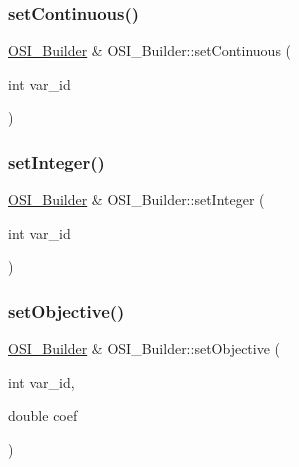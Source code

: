\mbox{\label{class_o_s_i___builder_abb4c8d13d5a3639ff22d9ec10960878c}} 
\subsubsection{\texorpdfstring{set\+Continuous()}{setContinuous()}}
{\footnotesize\ttfamily \hyperlink{class_o_s_i___builder}{O\+S\+I\+\_\+\+Builder} \& O\+S\+I\+\_\+\+Builder\+::set\+Continuous (\begin{DoxyParamCaption}\item[{int}]{var\+\_\+id }\end{DoxyParamCaption})}

\mbox{\label{class_o_s_i___builder_ab5da16db7740e228da63e4b58ab2069e}} 
\subsubsection{\texorpdfstring{set\+Integer()}{setInteger()}}
{\footnotesize\ttfamily \hyperlink{class_o_s_i___builder}{O\+S\+I\+\_\+\+Builder} \& O\+S\+I\+\_\+\+Builder\+::set\+Integer (\begin{DoxyParamCaption}\item[{int}]{var\+\_\+id }\end{DoxyParamCaption})}

\mbox{\label{class_o_s_i___builder_aaae1174492586d9ffe4b2cfec17823d7}} 
\subsubsection{\texorpdfstring{set\+Objective()}{setObjective()}}
{\footnotesize\ttfamily \hyperlink{class_o_s_i___builder}{O\+S\+I\+\_\+\+Builder} \& O\+S\+I\+\_\+\+Builder\+::set\+Objective (\begin{DoxyParamCaption}\item[{int}]{var\+\_\+id,  }\item[{double}]{coef }\end{DoxyParamCaption})}



